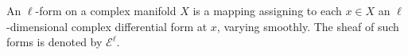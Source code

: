 An $\ell$-form on a complex manifold $X$ is a mapping assigning to each $x \in X$ an $\ell$-dimensional complex differential form at $x$, varying smoothly. The sheaf of such forms is denoted by $\mathcal{E}^\ell$.
